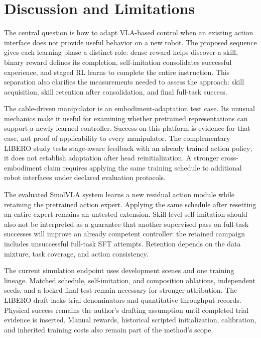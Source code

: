\section{Discussion and Limitations}\label{sec:discussion}
The central question is how to adapt VLA-based control when an existing action interface does not provide useful behavior on a new robot. The proposed sequence gives each learning phase a distinct role: dense reward helps discover a skill, binary reward defines its completion, self-imitation consolidates successful experience, and staged RL learns to complete the entire instruction. This separation also clarifies the measurements needed to assess the approach: skill acquisition, skill retention after consolidation, and final full-task success.

The cable-driven manipulator is an embodiment-adaptation test case. Its unusual mechanics make it useful for examining whether pretrained representations can support a newly learned controller. Success on this platform is evidence for that case, not proof of applicability to every manipulator. The complementary LIBERO study tests stage-aware feedback with an already trained action policy; it does not establish adaptation after head reinitialization. A stronger cross-embodiment claim requires applying the same training schedule to additional robot interfaces under declared evaluation protocols.

The evaluated SmolVLA system learns a new residual action module while retaining the pretrained action expert. Applying the same schedule after resetting an entire expert remains an untested extension. Skill-level self-imitation should also not be interpreted as a guarantee that another supervised pass on full-task successes will improve an already competent controller: the retained campaign includes unsuccessful full-task SFT attempts. Retention depends on the data mixture, task coverage, and action consistency.

The current simulation endpoint uses development scenes and one training lineage. Matched schedule, self-imitation, and composition ablations, independent seeds, and a locked final test remain necessary for stronger attribution. The LIBERO draft lacks trial denominators and quantitative throughput records. Physical success remains the author's drafting assumption until completed trial evidence is inserted. Manual rewards, historical scripted initialization, calibration, and inherited training costs also remain part of the method's scope.
